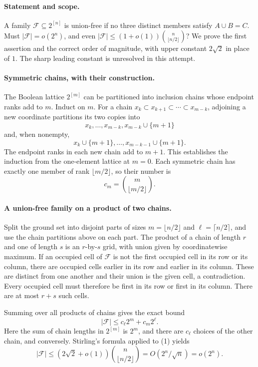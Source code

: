 \paragraph{Statement and scope.}
A family \(\mathcal F\subseteq2^{[n]}\) is union-free if no three
distinct members satisfy \(A\cup B=C\). Must
\(|\mathcal F|=o(2^n)\), and even
\(|\mathcal F|\leq(1+o(1))\binom n{\lfloor n/2\rfloor}\)?
We prove the first assertion and the correct order of magnitude, with
upper constant \(2\sqrt2\) in place of \(1\). The sharp leading
constant is unresolved in this attempt.

\paragraph{Symmetric chains, with their construction.}
The Boolean lattice \(2^{[m]}\) can be partitioned into inclusion chains
whose endpoint ranks add to \(m\). Induct on \(m\).
For a chain \(x_k\subset x_{k+1}\subset\cdots\subset x_{m-k}\),
adjoining a new coordinate partitions its two copies into
\[
 x_k,\ldots,x_{m-k},x_{m-k}\cup\{m+1\}
\]
and, when nonempty,
\[
 x_k\cup\{m+1\},\ldots,x_{m-k-1}\cup\{m+1\}.
\]
The endpoint ranks in each new chain add to \(m+1\).
This establishes the induction from the one-element lattice at \(m=0\).
Each symmetric chain has exactly one member of rank \(\lfloor m/2\rfloor\),
so their number is
\[
 c_m=\binom m{\lfloor m/2\rfloor}.
 \tag{1}
\]

\paragraph{A union-free family on a product of two chains.}
Split the ground set into disjoint parts of sizes
\(m=\lfloor n/2\rfloor\) and \(\ell=\lceil n/2\rceil\), and use the
chain partitions above on each part.
The product of a chain of length \(r\) and one of length \(s\)
is an \(r\)-by-\(s\) grid, with union given by coordinatewise maximum.
If an occupied cell of \(\mathcal F\) is not the first occupied cell
in its row or its column, there are occupied cells earlier in its row
and earlier in its column. These are distinct from one another and
their union is the given cell, a contradiction.
Every occupied cell must therefore be first in its row or first in
its column. There are at most \(r+s\) such cells.

Summing over all products of chains gives the exact bound
\[
 |\mathcal F|\leq c_\ell 2^m+c_m2^\ell.
 \tag{2}
\]
Here the sum of chain lengths in \(2^{[m]}\) is \(2^m\), and
there are \(c_\ell\) choices of the other chain, and conversely.
Stirling's formula applied to (1) yields
\[
 |\mathcal F|\leq
 (2\sqrt2+o(1))\binom n{\lfloor n/2\rfloor}
 =O(2^n/\sqrt n)=o(2^n).
 \tag{3}
\]

